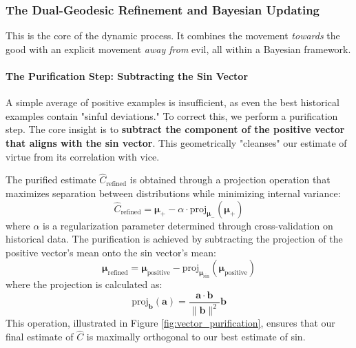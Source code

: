 \documentclass[11pt,a4paper]{article}
\theoremstyle{definition}
\theoremstyle{remark}
\begin{document}
\subsubsection{The Dual-Geodesic Refinement and Bayesian Updating}

This is the core of the dynamic process. It combines the movement \textit{towards} the good with an explicit movement \textit{away from} evil, all within a Bayesian framework.

\paragraph{The Purification Step: Subtracting the Sin Vector}

A simple average of positive examples is insufficient, as even the best historical examples contain "sinful deviations." To correct this, we perform a purification step. The core insight is to \textbf{subtract the component of the positive vector that aligns with the sin vector}. This geometrically "cleanses" our estimate of virtue from its correlation with vice.

The purified estimate \(\hat{C}_{\text{refined}}\) is obtained through a projection operation that maximizes separation between distributions while minimizing internal variance:
\begin{equation}
\hat{C}_{\text{refined}} = \boldsymbol{\mu}_+ - \alpha \cdot \text{proj}_{\boldsymbol{\mu}_-}(\boldsymbol{\mu}_+)
\end{equation}
where \(\alpha\) is a regularization parameter determined through cross-validation on historical data. The purification is achieved by subtracting the projection of the positive vector's mean onto the sin vector's mean:
\begin{equation}
\boldsymbol{\mu}_{\text{refined}} = \boldsymbol{\mu}_{\text{positive}} - \text{proj}_{\boldsymbol{\mu}_{\text{sin}}}(\boldsymbol{\mu}_{\text{positive}})
\end{equation}
where the projection is calculated as:
\begin{equation}
\text{proj}_{\mathbf{b}}(\mathbf{a}) = \frac{\mathbf{a} \cdot \mathbf{b}}{\|\mathbf{b}\|^2} \mathbf{b}
\end{equation}
This operation, illustrated in Figure \ref{fig:vector_purification}, ensures that our final estimate of \(\hat{C}\) is maximally orthogonal to our best estimate of sin.
\end{document}
